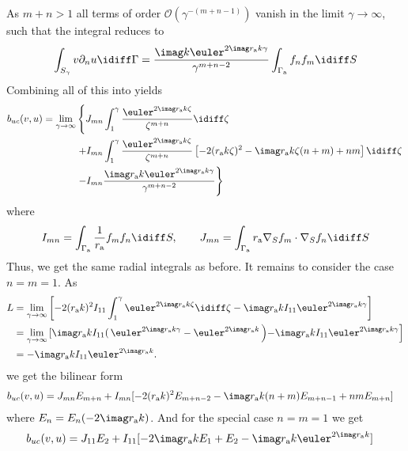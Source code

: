 As $m+n>1$ all terms of order $\mathcal{O}(\gamma^{-(m+n-1)})$ vanish in the limit $\gamma\to\infty$, such that the integral reduces to
\begin{equation*}
	\int_{S_\gamma} v\partial_n u\idiff\Gamma =  \frac{\imag k\euler^{2\imag r_{\mathrm{a}} k\gamma}}{\gamma^{m+n-2}}\int_{\Gamma_{\mathrm{a}}}f_n f_m\idiff S
\end{equation*}
Combining all of this into  yields
\begin{align*}
	b_{uc}(v,u) = \lim_{\gamma\to\infty}&\left\{J_{mn}\int_1^\gamma \frac{\euler^{2\imag r_{\mathrm{a}} k\zeta}}{\zeta^{m+n}}\idiff\zeta\right.\\
	&\left. + I_{mn}\int_1^\gamma\frac{\euler^{2\imag r_{\mathrm{a}} k\zeta}}{\zeta^{m+n}}\left[-2(r_{\mathrm{a}} k\zeta)^2 - \imag r_{\mathrm{a}} k\zeta(n + m) + nm\right]\idiff\zeta \right.\\
	&\left. - I_{mn}\frac{\imag r_{\mathrm{a}} k\euler^{2\imag r_{\mathrm{a}} k\gamma}}{\gamma^{m+n-2}}\right\}
\end{align*}
where
\begin{equation}\label{Eq2:infiniteElementsSurfaceIntegrals3}
	I_{mn} = \int_{\Gamma_{\mathrm{a}}} \frac{1}{r_{\mathrm{a}}} f_m f_n\idiff S,\qquad J_{mn} = \int_{\Gamma_{\mathrm{a}}} r_{\mathrm{a}} \nabla_S f_m \cdot\nabla_S f_n\idiff S
\end{equation}
Thus, we get the same radial integrals as before. It remains to consider the case $n=m=1$. As
\begin{align*}
	L &= \lim_{\gamma\to\infty}\left[-2(r_{\mathrm{a}} k)^2 I_{11}\int_1^\gamma \euler^{2\imag r_{\mathrm{a}} k \zeta}\idiff\zeta - \imag r_{\mathrm{a}} k I_{11}\euler^{2\imag r_{\mathrm{a}} k \gamma} \right]\\
	 &= \lim_{\gamma\to\infty}\left[\imag r_{\mathrm{a}} k  I_{11} \right(\euler^{2\imag r_{\mathrm{a}} k \gamma} - \euler^{2\imag r_{\mathrm{a}} k}\left) - \imag r_{\mathrm{a}} k I_{11} \euler^{2\imag r_{\mathrm{a}} k \gamma}\right]\\
	 &= - \imag r_{\mathrm{a}} k I_{11} \euler^{2\imag r_{\mathrm{a}} k}.
\end{align*}
we get the bilinear form
\begin{align*}
	b_{uc}(v,u) &= J_{mn}E_{m+n}+ I_{mn}[-2(r_{\mathrm{a}} k)^2E_{m+n-2} - \imag r_{\mathrm{a}} k(n+m)E_{m+n-1} + nm E_{m+n}]
\end{align*}
where $E_{n} = E_{n}(-2\imag r_{\mathrm{a}} k)$. And for the special case $n=m=1$ we get
\begin{align*}
	b_{uc}(v,u) &= J_{11}E_{2} + I_{11}[- 2\imag r_{\mathrm{a}} kE_{1} + E_{2}- \imag r_{\mathrm{a}} k \euler^{2\imag r_{\mathrm{a}} k}] 
\end{align*}
